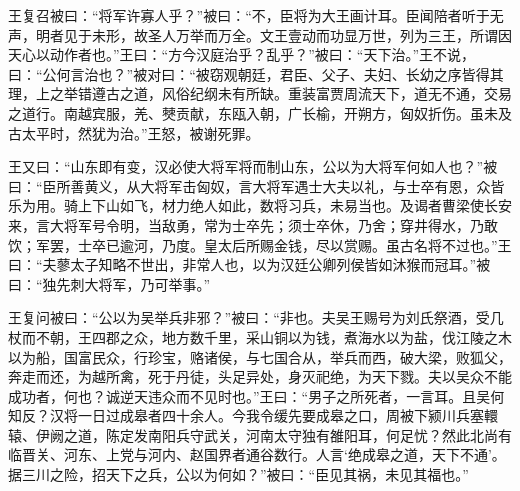\documentclass[12pt,UTF8]{ctexbook}
\begin{document}
王复召被曰：“将军许寡人乎？”被曰：“不，臣将为大王画计耳。臣闻陪者听于无声，明者见于未形，故圣人万举而万全。文王壹动而功显万世，列为三王，所谓因天心以动作者也。”王曰：“方今汉庭治乎？乱乎？”被曰：“天下治。”王不说，曰：“公何言治也？”被对曰：“被窃观朝廷，君臣、父子、夫妇、长幼之序皆得其理，上之举错遵古之道，风俗纪纲未有所缺。重装富贾周流天下，道无不通，交易之道行。南越宾服，羌、僰贡献，东瓯入朝，广长榆，开朔方，匈奴折伤。虽未及古太平时，然犹为治。”王怒，被谢死罪。



王又曰：“山东即有变，汉必使大将军将而制山东，公以为大将军何如人也？”被曰：“臣所善黄义，从大将军击匈奴，言大将军遇士大夫以礼，与士卒有恩，众皆乐为用。骑上下山如飞，材力绝人如此，数将习兵，未易当也。及谒者曹梁使长安来，言大将军号令明，当敌勇，常为士卒先；须士卒休，乃舍；穿井得水，乃敢饮；军罢，士卒已逾河，乃度。皇太后所赐金钱，尽以赏赐。虽古名将不过也。”王曰：“夫蓼太子知略不世出，非常人也，以为汉廷公卿列侯皆如沐猴而冠耳。”被曰：“独先刺大将军，乃可举事。”



王复问被曰：“公以为吴举兵非邪？”被曰：“非也。夫吴王赐号为刘氏祭酒，受几杖而不朝，王四郡之众，地方数千里，采山铜以为钱，煮海水以为盐，伐江陵之木以为船，国富民众，行珍宝，赂诸侯，与七国合从，举兵而西，破大梁，败狐父，奔走而还，为越所禽，死于丹徒，头足异处，身灭祀绝，为天下戮。夫以吴众不能成功者，何也？诚逆天违众而不见时也。”王曰：“男子之所死者，一言耳。且吴何知反？汉将一日过成皋者四十余人。今我令缓先要成皋之口，周被下颍川兵塞轘辕、伊阙之道，陈定发南阳兵守武关，河南太守独有雒阳耳，何足忧？然此北尚有临晋关、河东、上党与河内、赵国界者通谷数行。人言‘绝成皋之道，天下不通’。据三川之险，招天下之兵，公以为何如？”被曰：“臣见其祸，未见其福也。”
\end{document}
